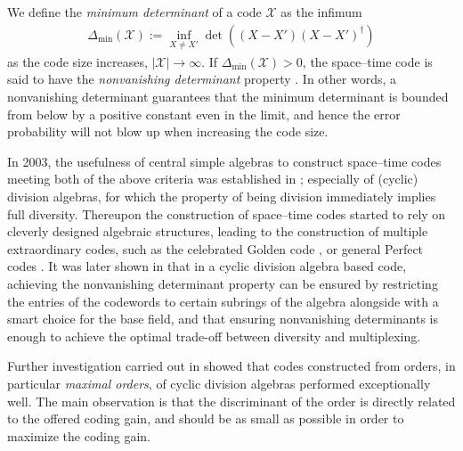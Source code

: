 \documentclass[smallextended]{svjour3}
\begin{document}
We define the \emph{minimum determinant} of a code $\mathcal{X}$ as the infimum 
\begin{align*}
	\Delta_{\min}(\mathcal{X}) := \inf\limits_{X \neq X'}{\det \left( (X-X')(X-X')^{\dagger}\right)}
\end{align*}
as the code size increases, $|\mathcal{X}| \to \infty$. If $\Delta_{\min}(\mathcal{X})  > 0$, the space--time code is said to have the \emph{nonvanishing determinant} property \cite{BR}.  In other words, a nonvanishing determinant guarantees that the minimum determinant is bounded from below by a positive constant even in the limit, and hence the error probability will not blow up when increasing the code size. 


In 2003, the usefulness of central simple algebras to construct space--time codes meeting both of the above criteria was established in \cite{SRS}; especially of (cyclic) division algebras, for which the property of being division immediately implies full diversity. Thereupon the construction of space--time codes started to rely on cleverly designed algebraic structures,  leading to the construction of multiple extraordinary codes, such as the celebrated Golden code \cite{BRV}, or general Perfect codes \cite{ORBV,ESK}.
It was later shown in \cite{BR} that in a cyclic division algebra based code, achieving the nonvanishing determinant property can be ensured by restricting the entries of the codewords to certain subrings of the algebra alongside with a smart choice for the base field, and that ensuring nonvanishing determinants is enough to achieve the optimal trade-off between diversity and multiplexing. 

Further investigation carried out in \cite{HLL,VHLR} showed that codes constructed from orders, in particular \emph{maximal orders}, of cyclic division algebras performed exceptionally well. The main observation is that the discriminant of the order is directly related to the offered coding gain, and should be as small as possible in order to maximize the coding gain. 
\end{document}
